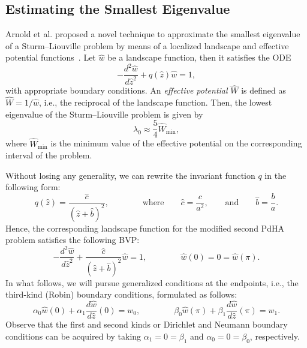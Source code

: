 \documentclass[symmetry,article,accept,moreauthors,pdftex,a4paper]{mdpi}
\begin{document}
\begin{paracol}{2}
\switchcolumn

\section{Estimating the Smallest Eigenvalue}	\label{estimate}

Arnold et al. proposed a novel technique to approximate the smallest eigenvalue of a Sturm--Liouville problem by means of a localized landscape  and effective potential functions~\cite{arnold2019computing,filoche2016universal}. Let $\widehat{w}$ be a landscape function, then it satisfies the ODE
\begin{equation}
-\frac{d^2\widehat{w}}{d\widehat{z}^2} + q(\widehat{z}) \widehat{w} = 1, 
\end{equation}
with appropriate boundary conditions. An \emph{effective potential} $\widehat{W}$ is defined as $\widehat{W} = 1/\widehat{w}$, i.e., the reciprocal of the landscape function. Then, the lowest eigenvalue of the Sturm--Liouville problem is given by
\begin{equation}
\lambda_0 \approx \frac{5}{4} \widehat{W}_\text{min},
\end{equation}
where $\widehat{W}_\text{min}$ is the minimum value of the effective potential on the corresponding interval of the problem.

Without losing any generality, we can rewrite the invariant function $q$ in the following form:
\begin{equation*}
q(\widehat{z}) = \frac{\widehat{c}}{\left(\widehat{z} + \widehat{b} \right)^2}, \qquad \qquad \text{where} \qquad \widehat{c} = \frac{c}{a^2}, \qquad \text{and} \qquad \widehat{b} = \frac{b}{a}.
\end{equation*}
Hence, the corresponding landscape function for the modified second PdHA problem satisfies the following BVP:
\begin{equation*}
-\frac{d^2\widehat{w}}{d\widehat{z}^2} +\frac{\widehat{c}}{\left(\widehat{z} + \widehat{b} \right)^2} \widehat{w} = 1, \qquad \qquad  \widehat{w}(0) = 0 = \widehat{w}(\pi).
\end{equation*}
In what follows, we will pursue generalized conditions at the endpoints, i.e., the third-kind (Robin) boundary conditions, formulated as follows:
\begin{equation*}
\alpha_0 \widehat{w}(0) + \alpha_1 \frac{d\widehat{w}}{d\widehat{z}}(0) = w_0, \qquad \qquad
\beta_0 \widehat{w}(\pi) + \beta_1 \frac{d\widehat{w}}{d\widehat{z}}(\pi) = w_1.
\end{equation*} 
Observe that the first and second kinds or Dirichlet and Neumann boundary conditions can be acquired by taking $\alpha_1 = 0 = \beta_1$ and $\alpha_0 = 0 = \beta_0$, respectively.


\end{paracol}
\end{document}
